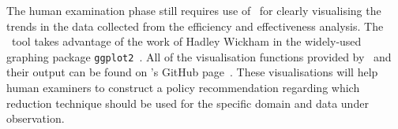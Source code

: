 
The human examination phase still requires use of \mr~for clearly visualising the trends in the data collected from
the efficiency and effectiveness analysis. The \mr~tool takes advantage of the work of Hadley Wickham in the widely-used
graphing package \texttt{ggplot2}~\cite{ggplot2}. All of the visualisation functions provided by \mr~and their output
can be found on \mr's GitHub page~\cite{tool}. These visualisations will help human examiners to construct a policy
recommendation regarding  which reduction technique should be used for the specific domain and data under observation.


